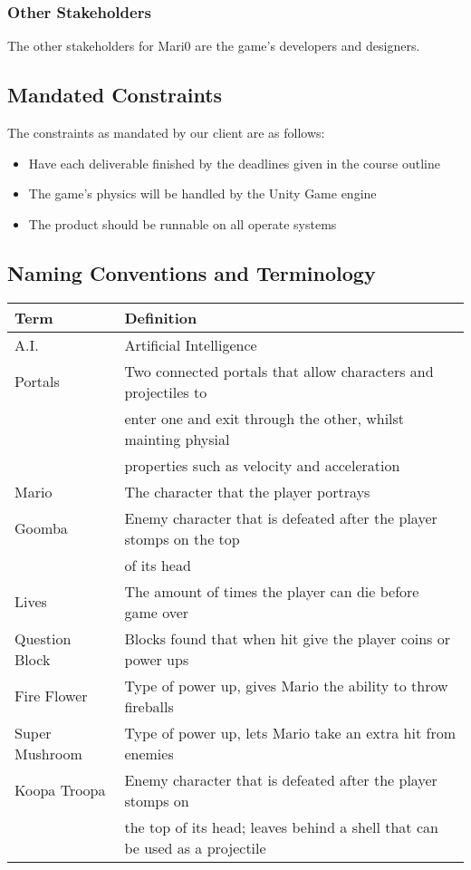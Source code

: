\documentclass[12pt, titlepage]{article}
\begin{document}
\subsubsection{Other Stakeholders}
The other stakeholders for Mari0 are the game's developers and designers.

\subsection{Mandated Constraints}
The constraints as mandated by our client are as follows:
\begin{itemize}
	\item Have each deliverable finished by the deadlines given in the course outline
	\item The game's physics will be handled by the Unity Game engine
	\item The product should be runnable on all operate systems
\end{itemize}

\subsection{Naming Conventions and Terminology}

\begin{tabular}{l l}
\hline
Term			& Definition \\
\hline
A.I.			 & Artificial Intelligence  \\
Portals      		 & Two connected portals that allow characters and projectiles to \\
			 & enter one and exit through the other, whilst mainting physial \\
			 & properties such as velocity and acceleration \\
Mario      		 & The character that the player portrays  \\
Goomba		 & Enemy character that is defeated after the player stomps on the top \\
			 & of its head	  \\
Lives			 & The amount of times the player can die before game over	\\
Question Block	 & Blocks found that when hit give the player coins or power ups	\\
Fire Flower		 & Type of power up, gives Mario the ability to throw fireballs	\\
Super Mushroom	 & Type of power up, lets Mario take an extra hit from enemies	\\
Koopa Troopa	 & Enemy character that is defeated after the player stomps on \\
			 & the top of its head; leaves behind a shell that can be used as a projectile	\\
\hline

\end{tabular}
\end{document}
